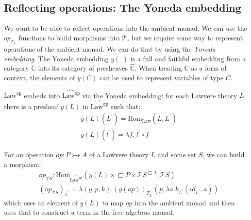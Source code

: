 \documentclass[acmsmall, screen, review, anonymous]{acmart}
\theoremstyle{definition}
\newcommand{\glob}{\mathop{\Box}}
\newcommand{\cat}{\mathbb{C}}
\newcommand{\catobj}{C}
\newcommand{\psh}{\widehat{\cat}}
\newcommand{\lawc}{\mathrm{Law}}
\newcommand{\lawcop}{\lawc^{\mathtt{op}}}
\newcommand{\pshlawcop}{\widehat{\lawcop}}
\newcommand{\yoneda}[1]{y(#1)}
\newcommand{\homset}[3]{\mathrm{Hom}_{#1}(#2, #3)}
\newcommand{\arrow}[2]{{#2}^{#1}}
\newcommand{\mon}{\mathcal{T}}
\newcommand{\types}{\mathrel{:}}
\begin{document}
\subsection{Reflecting operations: The Yoneda embedding}

We want to be able to reflect operations into the ambient monad. We can
use the $op_{T_L}$ functions to build morphisms into $\mon$, but we
require some way to represent operations of the ambient monad. We can do
that by using the \emph{Yoneda embedding}. The Yoneda embedding
$\yoneda{\_}$ is a full and faithful embedding from a category $\cat$
into its category of presheaves $\psh$. When treating $\cat$ as a form
of context, the elements of $y(\catobj)$ can be used to represent
variables of type $\catobj$.

$\lawcop$ embeds into $\pshlawcop$ via the Yoneda embedding: for each
Lawvere theory $L$ there is a presheaf $\yoneda{L}$ in $\pshlawcop$ such
that:
\begin{align*}
&\yoneda{L}(L^{\prime}) = \homset{\lawc}{L}{L^{\prime}} \\
&\yoneda{L}(l^{\prime}) = \lambda f.\; l^{\prime} \circ f
\end{align*}

For an operation $op \types P \rightarrowtail A$ of a Lawvere theory $L$
and some set $S$, we can build a morphism:
\begin{align*}
&op_{\mon{S}} \types
  \homset{\pshlawcop}
         {\yoneda{L} \times \glob P \times \arrow{\glob A}{\mon{S}}}
         {\mon{S}} \\
&{(op_{\mon{S}})}_{L^\prime}
  = \lambda(y, p, k). (y(op))_{T_{L^\prime}}(p, \lambda a. k_{L^\prime}(id_{L^\prime}, a))
\end{align*}
which uses an element of $\yoneda{L}$ to map $op$ into the ambient monad
and then uses that to construct a term in the free algebras monad.
\end{document}
